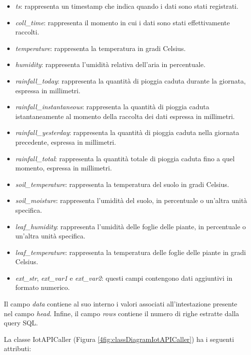 \begin{itemize}
    \item \textit{ts}: rappresenta un timestamp che indica quando i dati sono stati registrati.
    \item \textit{coll\_time}: rappresenta il momento in cui i dati sono stati effettivamente raccolti.
    \item \textit{temperature}: rappresenta la temperatura in gradi Celsius.
    \item \textit{humidity}: rappresenta l'umidità relativa dell'aria in percentuale. 
    \item \textit{rainfall\_today}: rappresenta la quantità di pioggia caduta durante la giornata, espressa in millimetri.
    \item \textit{rainfall\_instantaneous}: rappresenta la quantità di pioggia caduta istantaneamente al momento della raccolta dei dati espressa in millimetri.
    \item \textit{rainfall\_yesterday}: rappresenta la quantità di pioggia caduta nella giornata precedente, espressa in millimetri.
    \item \textit{rainfall\_total}: rappresenta la quantità totale di pioggia caduta fino a quel momento, espressa in millimetri.
    \item \textit{soil\_temperature}: rappresenta la temperatura del suolo in gradi Celsius.
    \item \textit{soil\_moisture}: rappresenta l'umidità del suolo, in percentuale o un'altra unità specifica.
    \item \textit{leaf\_humidity}: rappresenta l'umidità delle foglie delle piante, in percentuale o un'altra unità specifica.
    \item \textit{leaf\_temperature}: rappresenta la temperatura delle foglie delle piante in gradi Celsius.
    \item \textit{ext\_str}, \textit{ext\_var1} e \textit{ext\_var2}: questi campi contengono dati aggiuntivi in formato numerico.
\end{itemize}

Il campo \textit{data} contiene al suo interno i valori associati all'intestazione presente nel campo \textit{head}. Infine, il campo \textit{rows} contiene il numero di righe estratte dalla query SQL.

La classe IotAPICaller (Figura \ref{4fig:classDiagramIotAPICaller}) ha i seguenti attributi:

